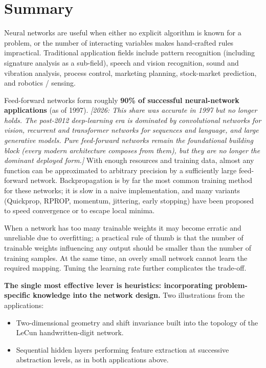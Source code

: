 \documentclass[12pt]{article}
\newcommand{\editornote}[1]{\textit{[2026: #1]}}
\begin{document}
\section{Summary}
Neural networks are useful when either no explicit algorithm is known for a problem, or the number of interacting variables makes hand-crafted rules impractical. Traditional application fields include pattern recognition (including signature analysis as a sub-field), speech and vision recognition, sound and vibration analysis, process control, marketing planning, stock-market prediction, and robotics / sensing.

Feed-forward networks form roughly \textbf{90\% of successful neural-network applications} (as of 1997). \editornote{This share was accurate in 1997 but no longer holds. The post-2012 deep-learning era is dominated by convolutional networks for vision, recurrent and transformer networks for sequences and language, and large generative models. Pure feed-forward networks remain the foundational building block (every modern architecture composes from them), but they are no longer the dominant deployed form.} With enough resources and training data, almost any function can be approximated to arbitrary precision by a sufficiently large feed-forward network. Backpropagation is by far the most common training method for these networks; it is slow in a naive implementation, and many variants (Quickprop, RPROP, momentum, jittering, early stopping) have been proposed to speed convergence or to escape local minima.

When a network has too many trainable weights it may become erratic and unreliable due to overfitting; a practical rule of thumb is that the number of trainable weights influencing any output should be smaller than the number of training samples. At the same time, an overly small network cannot learn the required mapping. Tuning the learning rate further complicates the trade-off.

\textbf{The single most effective lever is heuristics: incorporating problem-specific knowledge into the network design.} Two illustrations from the applications:
\begin{itemize}[leftmargin=1.2em]
  \item Two-dimensional geometry and shift invariance built into the topology of the LeCun handwritten-digit network.
  \item Sequential hidden layers performing feature extraction at successive abstraction levels, as in both applications above.
\end{itemize}
\end{document}
